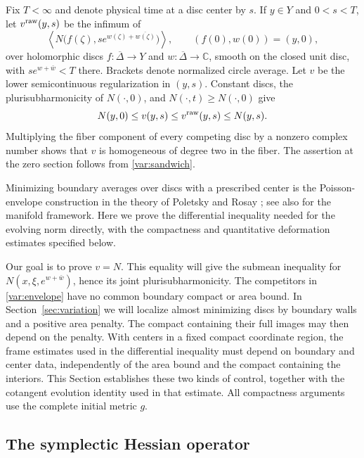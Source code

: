 \documentclass[11pt]{article}
\theoremstyle{definition}
\theoremstyle{remark}
\newcommand{\C}{\mathbb C}
\numberwithin{equation}{section}
\begin{document}
Fix $T<\infty$ and denote physical time at a disc center by $s$.
If $y\in Y$ and $0<s<T$, let $v^{\rm raw}(y,s)$ be the infimum of
\begin{equation}
 \left\langle N\bigl(f(\zeta),s e^{w(\zeta)+\overline{w(\zeta)}}\bigr)
 \right\rangle,
 \qquad (f(0),w(0))=(y,0),
 \label{var:envelope}
\end{equation}
over holomorphic discs $f:\overline\Delta\to Y$ and
$w:\overline\Delta\to\C$, smooth on the closed unit disc, with
$s e^{w+\bar w}<T$ there.  Brackets denote normalized circle average.
Let $v$ be the lower semicontinuous regularization in $(y,s)$.
Constant discs, the plurisubharmonicity of $N(\cdot,0)$, and
$N(\cdot,t)\ge N(\cdot,0)$ give
\begin{equation}
 N(y,0)\le v(y,s)\le v^{\rm raw}(y,s)\le N(y,s).
 \label{var:sandwich}
\end{equation}
Multiplying the fiber component of every competing disc by a nonzero
complex number shows that $v$ is homogeneous of degree two in the fiber.
The assertion at the zero section follows from \eqref{var:sandwich}.

Minimizing boundary averages over discs with a prescribed center is the
Poisson-envelope construction in the theory of Poletsky and Rosay
\cite{Poletsky1991,Rosay2003}; see also
\cite[Sections~1--2]{LarussonSigurdsson} for the manifold framework.
Here we prove the differential inequality needed for the evolving norm
directly, with the compactness and quantitative deformation estimates
specified below.

Our goal is to prove $v=N$.  This equality will give the submean
inequality for $N(x,\xi,e^{w+\bar w})$, hence its joint
plurisubharmonicity.  The competitors in \eqref{var:envelope} have no
common boundary compact or area bound.  In Section~\ref{sec:variation}
we will localize almost minimizing discs by boundary walls and a positive
area penalty.  The compact containing their full images may then depend
on the penalty.  With centers in a fixed compact coordinate region, the
frame estimates used in the differential inequality must depend on
boundary and center data, independently of the area bound and the
compact containing the interiors.  This Section establishes these two
kinds of control, together with the cotangent evolution identity used
in that estimate.  All compactness arguments use the complete initial
metric $g$.

\subsection{The symplectic Hessian operator}
\end{document}
